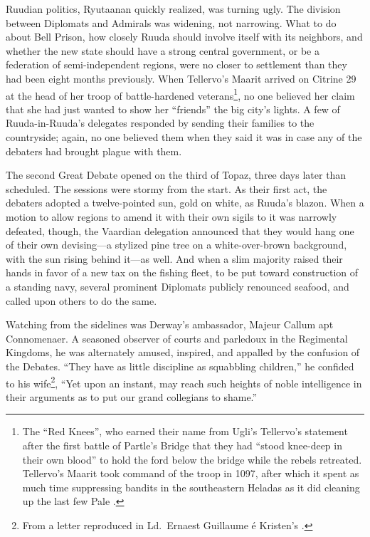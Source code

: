 \documentclass[12pt]{report}
\begin{document}
Ruudian politics, Ryutaanan quickly realized, was turning ugly.  The
division between Diplomats and Admirals was widening, not narrowing.
What to do about Bell Prison, how closely Ruuda should involve itself
with its neighbors, and whether the new state should have a strong
central government, or be a federation of semi-independent regions,
were no closer to settlement than they had been eight months
previously.  When Tellervo's Maarit arrived on Citrine 29 at the head
of her troop of battle-hardened veterans\footnote{The ``Red Knees'', who
earned their name from Ugli's Tellervo's statement after the first
battle of Partle's Bridge that they had ``stood knee-deep in their own
blood'' to hold the ford below the bridge while the rebels retreated.
Tellervo's Maarit took command of the troop in 1097, after which it
spent as much time suppressing bandits in the southeastern Heladas as
it did cleaning up the last few Pale .}, no one
believed her claim that she had just wanted to show her ``friends'' the
big city's lights.  A few of Ruuda-in-Ruuda's delegates responded by
sending their families to the countryside; again, no one believed them
when they said it was in case any of the debaters had brought plague
with them.

The second Great Debate opened on the third of Topaz, three days later
than scheduled.  The sessions were stormy from the start.  As their
first act, the debaters adopted a twelve-pointed sun, gold on white,
as Ruuda's blazon.  When a motion to allow regions to amend it with
their own sigils to it was narrowly defeated, though, the Vaardian
delegation announced that they would hang one of their own
devising---a stylized pine tree on a white-over-brown background, with
the sun rising behind it---as well.  And when a slim majority raised
their hands in favor of a new tax on the fishing fleet, to be put
toward construction of a standing navy, several prominent Diplomats
publicly renounced seafood, and called upon others to do the same.

Watching from the sidelines was Derway's ambassador, Majeur Callum apt
Connomenaer.  A seasoned observer of courts and parledoux in the
Regimental Kingdoms, he was alternately amused, inspired, and appalled
by the confusion of the Debates.  ``They have as little discipline as
squabbling children,'' he confided to his wife\footnote{From a letter
reproduced in Ld.\ Ernaest Guillaume \'{e} Kristen's .}, ``Yet upon an instant, may reach such heights of noble
intelligence in their arguments as to put our grand collegians to
shame.''
\end{document}
